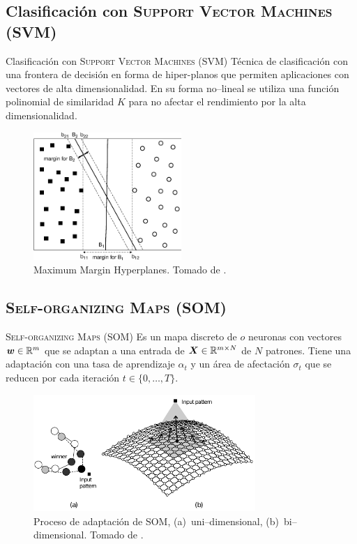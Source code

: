 \documentclass[10pt]{beamer}
\begin{document}
\subsection{Clasificación con \textsc{Support Vector Machines (SVM)}}
\begin{frame}{Clasificación con \textsc{Support Vector Machines (SVM)}}
  Técnica de clasificación con una frontera de decisión en forma de hiper-planos que permiten aplicaciones con vectores de alta dimensionalidad. En su forma no--lineal se utiliza una función polinomial de similaridad $K$ para no afectar el rendimiento por la alta dimensionalidad.
  \begin{figure}
    \centering
    \includegraphics[width=0.5\textwidth]{Images/svm-hyperplanes.pdf}
    \caption[Maximum Margin Hyperplanes]{Maximum Margin Hyperplanes. Tomado de \cite{tan2005introduction}.}
    \label{fig:svm-hyperplanes}
  \end{figure}
\end{frame}

\subsection{\textsc{Self-organizing Maps (SOM)}}
\begin{frame}{\textsc{Self-organizing Maps (SOM)}}
  Es un mapa discreto de $o$ neuronas con vectores ${\bm{w}} \in \mathbb{R}^m$ que se adaptan a una entrada de ${\bm{X}} \in \mathbb{R}^{m \times N}$ de $N$ patrones. Tiene una adaptación con una tasa de aprendizaje $\alpha_t$ y un área de afectación $\sigma_t$ que se reducen por cada iteración $t \in \{0, \ldots, T\}$.
  \begin{figure}
    \centering
    \includegraphics[width=0.75\textwidth]{Images/som-adaptive-proc.pdf}
    \caption[Proceso de adaptación de \textsc{SOM}]{Proceso de adaptación de \textsc{SOM}, (a)~uni--dimensional, (b)~bi--dimensional. Tomado de \cite{de2006fundamentals}.}
    \label{fig:som-adap-proc}
  \end{figure}
\end{frame}
\end{document}
